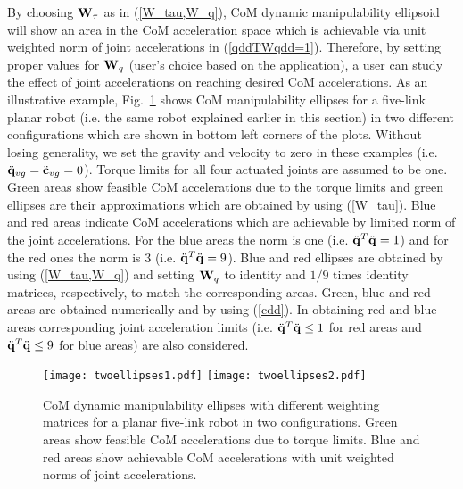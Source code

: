By choosing $\mathbf{W}_\tau$ as in (\ref{W_tau,W_q}), CoM dynamic manipulability
ellipsoid will show an area in the CoM acceleration space which is achievable
via unit weighted norm of joint accelerations in (\ref{qddTWqdd=1}).
Therefore, by setting proper values for $\mathbf{W}_q$ (user's choice based on the
application), a user can study the effect of joint accelerations on reaching
desired CoM accelerations.  As an illustrative example,
Fig.~\ref{two_ellipses} shows CoM manipulability ellipses for a five-link
planar robot (i.e. the same robot explained earlier in this section) in two
different configurations which are shown in bottom left corners of the plots.
Without losing generality, we set the gravity and velocity to zero in these
examples (i.e. $\ddot{\mathbf{q}}_{vg} = \ddot{\mathbf{c}}_{vg} = 0$).  Torque limits for
all four actuated joints are assumed to be one.  Green areas show feasible CoM
accelerations due to the torque limits and green ellipses are their
approximations which are obtained by using (\ref{W_tau}).  Blue and red areas
indicate CoM accelerations which are achievable by limited norm of the joint
accelerations.  For the blue areas the norm is one (i.e. $\ddot{\mathbf{q}}^T
\ddot{\mathbf{q}} = 1$) and for the red ones the norm is $3$ (i.e. $\ddot{\mathbf{q}}^T
\ddot{\mathbf{q}} = 9$).  Blue and red ellipses are obtained by using
(\ref{W_tau,W_q}) and setting $\mathbf{W}_q$ to identity and $1/9$ times identity
matrices, respectively, to match the corresponding areas.  Green, blue and red
areas are obtained numerically and by using (\ref{cdd}).  In obtaining red and
blue areas corresponding joint acceleration limits (i.e. $\ddot{\mathbf{q}}^T
\ddot{\mathbf{q}} \leq 1$ for red areas and $\ddot{\mathbf{q}}^T \ddot{\mathbf{q}} \leq 9$ for blue
areas) are also considered.
%
\begin{figure}
	\centering
	\texttt{[image: twoellipses1.pdf]}
 	\texttt{[image: twoellipses2.pdf]}
	\caption{CoM dynamic manipulability ellipses with different weighting
		matrices for a planar five-link robot in two configurations.  Green areas
		show feasible CoM accelerations due to torque limits.  Blue and red areas
		show achievable CoM accelerations with unit weighted norms of joint
		accelerations.}
	\label{two_ellipses}
\end{figure}
%

